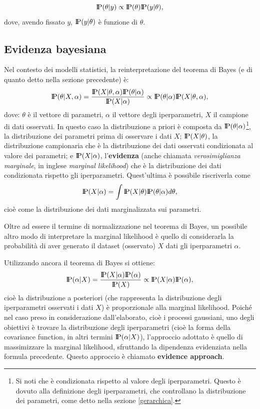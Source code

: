 \[
\text{I\kern-0.18em P}(\theta | y)\propto \text{I\kern-0.18em P}(\theta)\text{I\kern-0.18em P}(y|\theta),
\]
dove, avendo fissato $y$, $\text{I\kern-0.18em P}(y|\theta)$ è funzione di $\theta$.

\newpage

\subsection{Evidenza bayesiana}\label{evidenzaBayesiana}
Nel contesto dei modelli statistici, la reinterpretazione del teorema di Bayes (e di quanto detto nella sezione precedente) è:
\[
\text{I\kern-0.18em P}(\theta | X, \alpha) = \frac{\text{I\kern-0.18em P}(X|\theta, \alpha)\text{I\kern-0.18em P}(\theta | \alpha)}{\text{I\kern-0.18em P}(X|\alpha)}\propto \text{I\kern-0.18em P}(\theta | \alpha) \text{I\kern-0.18em P}(X|\theta, \alpha),
\]
dove: $\theta$ è il vettore di parametri, $\alpha$ il vettore degli iperparametri, $X$ il campione di dati osservati. In questo caso la distribuzione a priori è composta da $\text{I\kern-0.18em P}(\theta|\alpha)$\footnote{Si noti che è condizionata rispetto al valore degli iperparametri. Questo è dovuto alla definizione degli iperparametri, che controllano la distribuzione dei parametri, come detto nella sezione \ref{gerarchica}.}, la distribuzione dei parametri prima di osservare i dati $X$; $\text{I\kern-0.18em P}(X|\theta)$, la distribuzione campionaria che è la distribuzione dei dati osservati condizionata al valore dei parametri; e $\text{I\kern-0.18em P}(X|\alpha)$, l'\textbf{evidenza} (anche chiamata \textit{verosimiglianza marginale}, in inglese \textit{marginal likelihood}) che è la distribuzione dei dati condizionata rispetto gli iperparametri. Quest'ultima è possibile riscriverla come
\[
\text{I\kern-0.18em P}(X|\alpha) = \int \text{I\kern-0.18em P}(X|\theta)\text{I\kern-0.18em P}(\theta | \alpha)d\theta,
\]
cioè come la distribuzione dei dati marginalizzata sui parametri.

Oltre ad essere il termine di normalizzazione nel teorema di Bayes, un possibile altro modo di interpretare la marginal likelihood è quello di considerarla la probabilità di aver generato il dataset (osservato) $X$ dati gli iperparametri $\alpha$.

Utilizzando ancora il teorema di Bayes si ottiene:
\[
\text{I\kern-0.18em P}(\alpha |X) = \frac{\text{I\kern-0.18em P}(X|\alpha)\text{I\kern-0.18em P}(\alpha)}{\text{I\kern-0.18em P}(X)}\propto \text{I\kern-0.18em P}(X|\alpha) \text{I\kern-0.18em P}(\alpha),
\]
cioè la distribuzione a posteriori (che rappresenta la distribuzione degli iperparametri osservati i dati $X$) è proporzionale alla marginal likelihood. Poiché nel caso preso in considerazione dall'elaborato, cioè i processi gaussiani, uno degli obiettivi è trovare la distribuzione degli iperparametri (cioè la forma della covariance function, in altri termini $\text{I\kern-0.18em P}(\alpha|X)$), l'approccio adottato è quello di massimizzare la marginal likelihood, sfruttando la dipendenza evidenziata nella formula precedente. Questo approccio è chiamato \textbf{evidence approach}.

